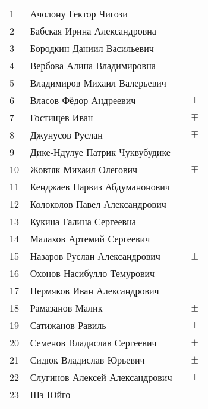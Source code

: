 \documentclass[a4paper,landscape,11pt]{article}
\newcommand*\ok{&{\small \ding{51}}} %
\newcommand*\no{&{\small }} %
\newcommand*\PM{&$\pm$}
\newcommand*\MP{&$\mp$}
\begin{document}
\begin{tabular}{p{7pt}|l|p{6pt}p{6pt}}
\\
\midrule
		1\,&Ачолону Гектор Чигози\no\\
		2\,&Бабская Ирина Александровна\ok\ok\\
		3\,&Бородкин Даниил Васильевич\ok\ok\\
		4\,&Вербова Алина Владимировна\no\\
		5\,&Владимиров Михаил Валерьевич\ok\ok\\
		6\,&Власов Фёдор Андреевич\ok\MP\\
		7\,&Гостищев Иван\ok\MP\\
		8\,&Джунусов Руслан\ok\MP\\
		9\,&Дике-Ндулуе Патрик Чуквубудике\ok\\
		10\,&Жовтяк Михаил Олегович\no\MP\\
		11\,&Кенджаев Парвиз Абдуманонович\ok\\
		12\,&Колоколов Павел Александрович\no\\
		13\,&Кукина Галина Сергеевна\ok\\
		14\,&Малахов Артемий Сергеевич\ok\ok\\
		15\,&Назаров Руслан Александрович\ok\PM\\
		16\,&Охонов Насибулло Темурович\ok\\
		17\,&Пермяков Иван Александрович\ok\ok\\
		18\,&Рамазанов Малик\ok\PM\\
		19\,&Сатижанов Равиль\ok\MP\\
		20\,&Семенов Владислав Сергеевич\ok\PM\\
		21\,&Сидюк Владислав Юрьевич\ok\PM\\
		22\,&Слугинов Алексей Александрович\ok\MP\\
		23\,&Шэ Юйго\ok\\
\bottomrule
\end{tabular} 
\end{document}

